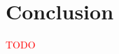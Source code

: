 \documentclass{article}
\newcommand{\xxx}[1]{\textcolor{red}{#1}}
\theoremstyle{plain}
\theoremstyle{definition}
\theoremstyle{remark}
\begin{document}
\section{Conclusion}

\xxx{TODO}




\end{document}
